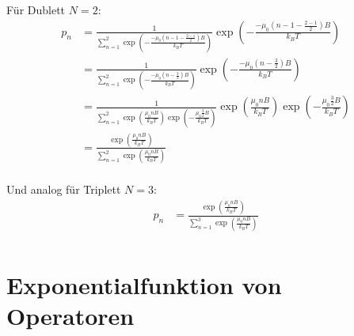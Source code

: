 \documentclass[a4paper,11pt]{article}
\begin{document}
Für Dublett $N=2$:
\begin{equation}
\begin{aligned}
p_n &= \frac{1}{\sum_{n=1}^2 \exp \left( -\frac{-\mu_0 \left( n-1-\frac{2-1}{2} \right) B }{k_B T} \right)} \exp \left( -\frac{-\mu_0 \left( n-1-\frac{2-1}{2} \right) B}{k_B T} \right) \\
    &= \frac{1}{\sum_{n=1}^2 \exp \left( -\frac{-\mu_0 \left( n-\frac{3}{2} \right) B }{k_B T} \right)} \exp \left( -\frac{-\mu_0 \left( n-\frac{3}{2} \right) B}{k_B T} \right) \\
    &= \frac{1}{\sum_{n=1}^2 \exp \left( \frac{\mu_0 n B }{k_B T} \right)\exp \left( -\frac{\mu_0 \frac{3}{2} B }{k_B T} \right)} \exp \left( \frac{\mu_0 n B }{k_B T} \right)\exp \left( -\frac{\mu_0 \frac{3}{2} B }{k_B T} \right) \\
    &= \frac{\exp \left( \frac{\mu_0 n B }{k_B T} \right)}{\sum_{n=1}^2 \exp \left( \frac{\mu_0 n B }{k_B T} \right)} \\
\end{aligned}
\end{equation}

Und analog für Triplett $N=3$:
\begin{equation}
\begin{aligned}
p_n &= \frac{\exp \left( \frac{\mu_0 n B }{k_B T} \right)}{\sum_{n=1}^3 \exp \left( \frac{\mu_0 n B }{k_B T} \right)} \\
\end{aligned}
\end{equation}

\subsection{}

\subsection{}

\subsection{}

\section{Exponentialfunktion von Operatoren}

\subsection{}

\subsection{}

\subsection{}
\end{document}
